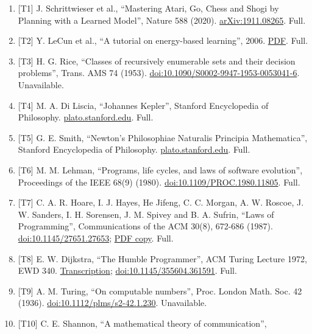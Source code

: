 \documentclass[10pt,letterpaper]{article}
\providecommand{\tightlist}{\setlength{\itemsep}{1pt}\setlength{\parskip}{0pt}}
\begin{document}
\begin{enumerate}
\def\labelenumi{\arabic{enumi}.}
\tightlist
\item
  {[}T1{]} J. Schrittwieser et al., ``Mastering Atari, Go, Chess and
  Shogi by Planning with a Learned Model'', Nature 588 (2020).
  \href{https://arxiv.org/abs/1911.08265}{arXiv:1911.08265}. Full.
\item
  {[}T2{]} Y. LeCun et al., ``A tutorial on energy-based learning'',
  2006. \href{http://yann.lecun.com/exdb/publis/pdf/lecun-06.pdf}{PDF}.
  Full.
\item
  {[}T3{]} H. G. Rice, ``Classes of recursively enumerable sets and
  their decision problems'', Trans. AMS 74 (1953).
  \href{https://doi.org/10.1090/S0002-9947-1953-0053041-6}{doi:10.1090/S0002-9947-1953-0053041-6}.
  Unavailable.
\item
  {[}T4{]} M. A. Di Liscia, ``Johannes Kepler'', Stanford Encyclopedia
  of Philosophy.
  \href{https://plato.stanford.edu/entries/kepler/}{plato.stanford.edu}.
  Full.
\item
  {[}T5{]} G. E. Smith, ``Newton's Philosophiae Naturalis Principia
  Mathematica'', Stanford Encyclopedia of Philosophy.
  \href{https://plato.stanford.edu/entries/newton-principia/}{plato.stanford.edu}.
  Full.
\item
  {[}T6{]} M. M. Lehman, ``Programs, life cycles, and laws of software
  evolution'', Proceedings of the IEEE 68(9) (1980).
  \href{https://doi.org/10.1109/PROC.1980.11805}{doi:10.1109/PROC.1980.11805}.
  Full.
\item
  {[}T7{]} C. A. R. Hoare, I. J. Hayes, He Jifeng, C. C. Morgan, A. W.
  Roscoe, J. W. Sanders, I. H. Sorensen, J. M. Spivey and B. A. Sufrin,
  ``Laws of Programming'', Communications of the ACM 30(8), 672-686
  (1987).
  \href{https://doi.org/10.1145/27651.27653}{doi:10.1145/27651.27653};
  \href{https://www.cs.ox.ac.uk/bill.roscoe/publications/20.pdf}{PDF
  copy}. Full.
\item
  {[}T8{]} E. W. Dijkstra, ``The Humble Programmer'', ACM Turing Lecture
  1972, EWD 340.
  \href{https://www.cs.utexas.edu/~EWD/transcriptions/EWD03xx/EWD340.html}{Transcription};
  \href{https://doi.org/10.1145/355604.361591}{doi:10.1145/355604.361591}.
  Full.
\item
  {[}T9{]} A. M. Turing, ``On computable numbers'', Proc. London Math.
  Soc. 42 (1936).
  \href{https://doi.org/10.1112/plms/s2-42.1.230}{doi:10.1112/plms/s2-42.1.230}.
  Unavailable.
\item
  {[}T10{]} C. E. Shannon, ``A mathematical theory of communication'',

\end{enumerate}
\end{document}
